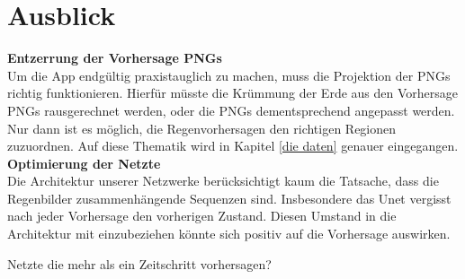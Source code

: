 \section{Ausblick}
\textbf{Entzerrung der Vorhersage PNGs} \\
Um die App endgültig praxistauglich zu machen, muss die Projektion der PNGs richtig funktionieren. 
Hierfür müsste die Krümmung der Erde aus den Vorhersage PNGs rausgerechnet werden, oder die PNGs dementsprechend angepasst werden. 
Nur dann ist es möglich, die Regenvorhersagen den richtigen Regionen zuzuordnen. 
Auf diese Thematik wird in Kapitel \ref*{die daten} genauer eingegangen. \\

\noindent \textbf{Optimierung der Netzte} \\
Die Architektur unserer Netzwerke berücksichtigt kaum die Tatsache, dass die Regenbilder zusammenhängende Sequenzen sind.
Insbesondere das Unet vergisst nach jeder Vorhersage den vorherigen Zustand. Diesen Umstand in die Architektur mit einzubeziehen könnte sich positiv auf die Vorhersage auswirken.

Netzte die mehr als ein Zeitschritt vorhersagen?\\
